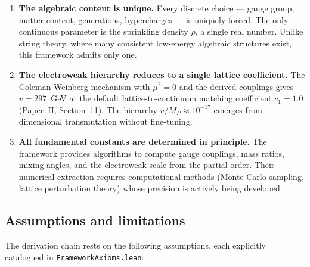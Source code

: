 \documentclass[11pt,letterpaper]{article}
\begin{document}
\begin{enumerate}[label=(\roman*)]
  \item \textbf{The algebraic content is unique.}  Every discrete
    choice --- gauge group, matter content, generations, hypercharges
    --- is uniquely forced.  The only continuous parameter is the
    sprinkling density $\rho$, a single real number.  Unlike string
    theory, where many consistent low-energy algebraic structures
    exist, this framework admits only one.

  \item \textbf{The electroweak hierarchy reduces to a single
    lattice coefficient.}  The Coleman-Weinberg mechanism with
    $\mu^2 = 0$ and the derived couplings gives $v = 297$~GeV at
    the default lattice-to-continuum matching coefficient
    $c_1 = 1.0$ (Paper~II, Section~11).  The hierarchy
    $v/M_P \approx 10^{-17}$ emerges from dimensional
    transmutation without fine-tuning.

  \item \textbf{All fundamental constants are determined in
    principle.}  The framework provides algorithms to compute gauge
    couplings, mass ratios, mixing angles, and the electroweak
    scale from the partial order.  Their numerical extraction
    requires computational methods (Monte Carlo sampling, lattice
    perturbation theory) whose precision is actively being
    developed.
\end{enumerate}

\subsection{Assumptions and limitations}

The derivation chain rests on the following assumptions, each
explicitly catalogued in \texttt{Framework\-Axioms.lean}:
\end{document}
